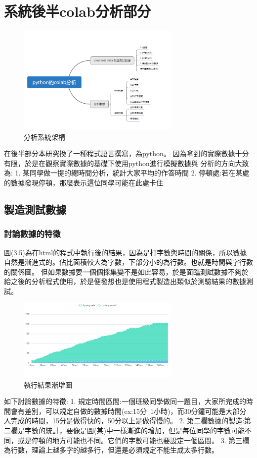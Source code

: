 \section{系統後半colab分析部分}
	\begin{figure}[H] %
	\centering %
	\includegraphics[width=0.7\textwidth]{2.png} %
	\caption{分析系統架構} %
	\label{Fig.3.4} %
	\end{figure}
在後半部分本研究換了一種程式語言撰寫，為python。
因為拿到的實際數據十分有限，於是在觀察實際數據的基礎下使用python進行模擬數據與
分析的方向大致為:
1. 某同學做一提的總時間分析，統計大家平均的作答時間
2. 停頓處:若在某處的數據發現停頓，那麼表示這位同學可能在此處卡住
\subsection{製造測試數據}
\subsubsection{討論數據的特徵}
圖(3.5)為在html的程式中執行後的結果，因為是打字數與時間的關係，所以數據自然是漸進式的。佔比面積較大為字數，下部分小的為行數。也就是時間與字行數的關係圖。
但如果數據要一個個採集變不是如此容易，於是面臨測試數據不夠於給之後的分析程式使用，於是便發想也是使用程式製造出類似於測驗結果的數據測試。
	\begin{figure}[H] %
	\centering %
	\includegraphics[width=0.7\textwidth]{4.png} %
	\caption{執行結果漸增圖} %
	\label{Fig.3.5} %
	\end{figure}
如下討論數據的特徵:
1. 規定時間區間:一個班級同學做同一題目，大家所完成的時間會有差別，可以規定自做的數據時間(ex:15分~1小時)，而30分鐘可能是大部分人完成的時間，15分是做得快的，50分以上是做得慢的。
2. 第二欄數據的製造:第二欄是字數的統計，要像是圖(某)中一樣漸進的增加，但是每位同學的字數可能不同，或是停頓的地方可能也不同。它們的字數可能也要設定一個區間。
3. 第三欄為行數，理論上越多字的越多行，但還是必須規定不能生成太多行數。
